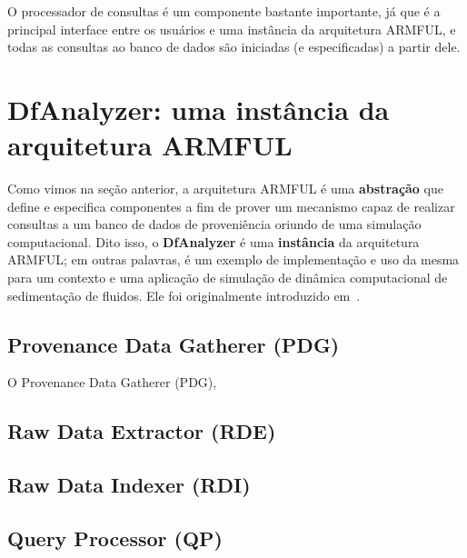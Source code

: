 O processador de consultas é um componente bastante importante, já que é a principal interface entre os usuários e uma instância da arquitetura ARMFUL, e todas as consultas ao banco de dados são iniciadas (e especificadas) a partir dele.

\section{DfAnalyzer: uma instância da arquitetura ARMFUL}

Como vimos na seção anterior, a arquitetura ARMFUL é uma \textbf{abstração} que define e especifica componentes a fim de prover um mecanismo capaz de realizar consultas a um banco de dados de proveniência oriundo de uma simulação computacional. Dito isso, o \textbf{DfAnalyzer} é uma \textbf{instância} da arquitetura ARMFUL; em outras palavras, é um exemplo de implementação e uso da mesma para um contexto e uma aplicação de simulação de dinâmica computacional de sedimentação de fluidos. Ele foi originalmente introduzido em~\cite{silva2016situ}.


\subsection{Provenance Data Gatherer (PDG)}

O Provenance Data Gatherer (PDG), 



\subsection{Raw Data Extractor (RDE)}


\subsection{Raw Data Indexer (RDI)}


\subsection{Query Processor (QP)}


